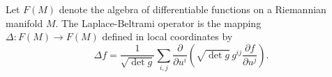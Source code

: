 Let $F(M)$ denote the algebra of differentiable functions on a Riemannian manifold $M$. The Laplace-Beltrami operator is the mapping $\Delta: F(M) \to F(M)$ defined in local coordinates by
$$\Delta f = \frac{1}{\sqrt{\det g}} \sum_{i,j} \frac{\partial}{\partial u^i} \left( \sqrt{\det g}\, g^{ij} \frac{\partial f}{\partial u^j} \right).$$